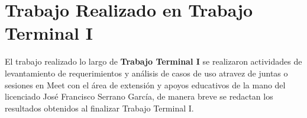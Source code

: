 \clearpage
\section{Trabajo Realizado en Trabajo Terminal I}
El trabajo realizado lo largo de \textbf{Trabajo Terminal I} se realizaron actividades de levantamiento de requerimientos y análisis de casos de uso atravez de juntas 
o sesiones en Meet con el área de extensión y apoyos educativos de la mano del licenciado José Francisco Serrano García, de manera breve se redactan los resultados obtenidos al finalizar Trabajo Terminal I.\\





